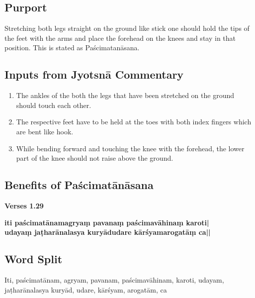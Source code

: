 \subsection*{Purport}
\vspace{-10pt}

Stretching both legs straight on the ground like stick one should hold the tips of the feet with the arms and place the forehead on the knees and stay in that position. This is stated as Paścimatanāsana.
\vspace{-10pt}

\subsection*{Inputs from Jyotsnā Commentary}
\vspace{-10pt}

\begin{enumerate}
\itemsep=0pt
\item The ankles of the both the legs that have been stretched on the ground should touch each other. 
\item The respective feet have to be held at the toes with both index fingers which are bent like hook.  
\item While bending forward and touching the knee with the forehead, the lower part of the knee should not raise above the ground.
\end{enumerate}
\vspace{-10pt}

\subsection*{Benefits of Paścimatānāsana}
\vspace{-10pt}

\noindent 
\textbf{Verses 1.29}

\begin{shloka}
\textbf{iti paścimatānamagryaṃ pavanaṃ paścimavāhinaṃ karoti|}\\
\textbf{udayaṃ jaṭharānalasya kuryādudare kārśyamarogatāṃ ca||}
\end{shloka}
\vspace{-10pt}

\subsection*{Word Split}
\vspace{-10pt}

Iti, paścimatānam, agryam, pavanam, paścimavāhinam, karoti, udayam, jaṭharānalasya kuryād, udare, kārśyam, arogatām, ca

